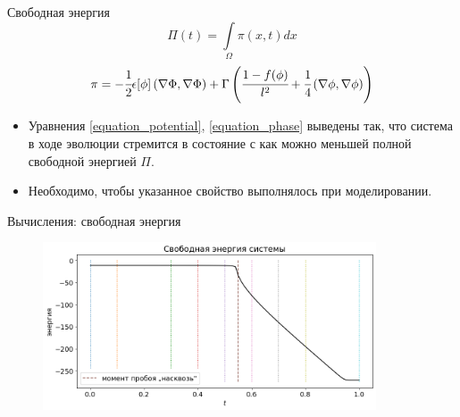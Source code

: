 \begin{frame}{Свободная энергия}
\vspace{-0.5cm}
$$\Pi(t) = \int\limits_\Omega \pi(x, t) dx$$
$$\pi = -\cfrac{1}{2} \epsilon[\phi] \left( \nabla \Phi, \nabla \Phi \right) + \Gamma \left( \cfrac{1 - f(\phi)}{l^2} + \cfrac{1}{4} \left( \nabla \phi, \nabla \phi \right) \right)$$
\begin{itemize}
	\item Уравнения \eqref{equation_potential}, \eqref{equation_phase} выведены так, что система в ходе эволюции стремится в состояние с как можно меньшей полной свободной энергией $\Pi$.
	\item Необходимо, чтобы указанное свойство выполнялось при моделировании.
\end{itemize}
\end{frame}


\begin{frame}{Вычисления: свободная энергия}
\vspace{-0.6cm}
\begin{figure}
	\includegraphics[width=0.88\textwidth]{figures/energy_total.png}
\end{figure}
\end{frame}